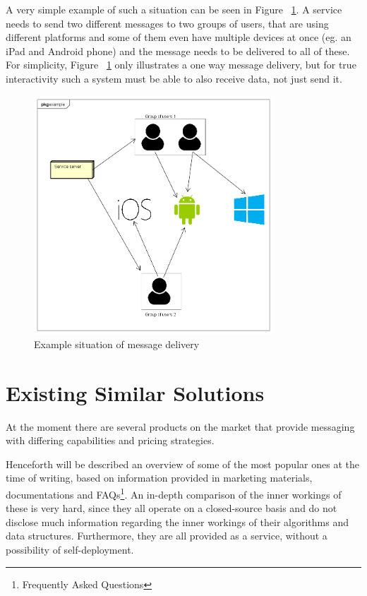 A very simple example of such a situation can be seen in Figure ~\ref{fig:example-situation}. A service needs to send two different messages to two groups of users, that are using different platforms and some of them even have multiple devices at once (eg. an iPad and Android phone) and the message needs to be delivered to all of these. For simplicity, Figure ~\ref{fig:example-situation} only illustrates a one way message delivery, but for true interactivity such a system must be able to also receive data, not just send it.

\begin{figure}[H]
	\centering
	\includegraphics[width=0.8\textwidth]{figures/02_analysis/example-situation}
    \caption{Example situation of message delivery}
    \label{fig:example-situation}
\end{figure}

\section{Existing Similar Solutions} \label{sec:similar-solutions}
At the moment there are several products on the market that provide messaging with differing capabilities and pricing strategies.

Henceforth will be described an overview of some of the most popular ones at the time of writing, based on information provided in marketing materials, documentations and FAQs\footnote{Frequently Asked Questions}. An in-depth comparison of the inner workings of these is very hard, since they all operate on a closed-source basis and do not disclose much information regarding the inner workings of their algorithms and data structures. Furthermore, they are all provided as a service, without a possibility of self-deployment.

